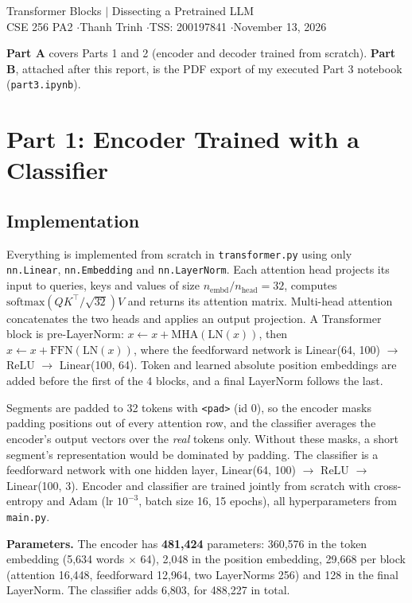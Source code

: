 \documentclass[10pt]{article}
\begin{document}
\begin{center}
{\Large Transformer Blocks $|$ Dissecting a Pretrained LLM}\\[6pt]
CSE 256 PA2 \quad$\cdot$\quad Thanh Trinh \quad$\cdot$\quad TSS: 200197841 \quad$\cdot$\quad November 13, 2026
\end{center}

\noindent\textbf{Part A} covers Parts 1 and 2 (encoder and decoder trained from scratch). \textbf{Part B}, attached
after this report, is the PDF export of my executed Part 3 notebook (\texttt{part3.ipynb}).

\section{Part 1: Encoder Trained with a Classifier}

\subsection{Implementation}

Everything is implemented from scratch in \texttt{transformer.py} using only \texttt{nn.Linear},
\texttt{nn.Embedding} and \texttt{nn.LayerNorm}. Each attention head projects its input to queries, keys and values
of size $n_\text{embd}/n_\text{head} = 32$, computes $\mathrm{softmax}(QK^\top/\sqrt{32})V$ and returns its attention
matrix. Multi-head attention concatenates the two heads and applies an output projection. A Transformer block is
pre-LayerNorm: $x \leftarrow x + \mathrm{MHA}(\mathrm{LN}(x))$, then $x \leftarrow x + \mathrm{FFN}(\mathrm{LN}(x))$,
where the feedforward network is Linear(64, 100) $\to$ ReLU $\to$ Linear(100, 64). Token and learned absolute
position embeddings are added before the first of the 4 blocks, and a final LayerNorm follows the last.

Segments are padded to 32 tokens with \texttt{<pad>} (id 0), so the encoder masks padding positions out of every
attention row, and the classifier averages the encoder's output vectors over the \emph{real} tokens only. Without
these masks, a short segment's representation would be dominated by padding. The classifier is a feedforward network
with one hidden layer, Linear(64, 100) $\to$ ReLU $\to$ Linear(100, 3). Encoder and classifier are trained jointly
from scratch with cross-entropy and Adam (lr $10^{-3}$, batch size 16, 15 epochs), all hyperparameters from
\texttt{main.py}.

\textbf{Parameters.} The encoder has \textbf{481,424} parameters: 360,576 in the token embedding (5,634 words
$\times$ 64), 2,048 in the position embedding, 29,668 per block (attention 16,448, feedforward 12,964, two
LayerNorms 256) and 128 in the final LayerNorm. The classifier adds 6,803, for 488,227 in total.
\end{document}
